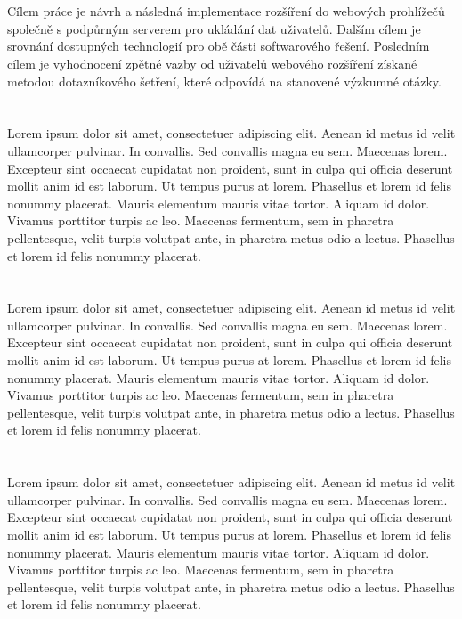 \section*{\CilPrace}
Cílem práce je návrh a následná implementace rozšíření do webových prohlížečů společně s podpůrným serverem pro ukládání dat uživatelů. Dalším cílem je srovnání dostupných technologií pro obě části softwarového řešení. Posledním cílem je vyhodnocení zpětné vazby od uživatelů webového rozšíření získané metodou dotazníkového šetření, které odpovídá na stanovené výzkumné otázky.

\section*{\PouziteMetody}
Lorem ipsum dolor sit amet, consectetuer adipiscing elit. Aenean id metus id velit ullamcorper pulvinar. In convallis. Sed convallis magna eu sem. Maecenas lorem. Excepteur sint occaecat cupidatat non proident, sunt in culpa qui officia deserunt mollit anim id est laborum. Ut tempus purus at lorem. Phasellus et lorem id felis nonummy placerat. Mauris elementum mauris vitae tortor. Aliquam id dolor. Vivamus porttitor turpis ac leo. Maecenas fermentum, sem in pharetra pellentesque, velit turpis volutpat ante, in pharetra metus odio a lectus. Phasellus et lorem id felis nonummy placerat.

\section*{\Vysledky}
Lorem ipsum dolor sit amet, consectetuer adipiscing elit. Aenean id metus id velit ullamcorper pulvinar. In convallis. Sed convallis magna eu sem. Maecenas lorem. Excepteur sint occaecat cupidatat non proident, sunt in culpa qui officia deserunt mollit anim id est laborum. Ut tempus purus at lorem. Phasellus et lorem id felis nonummy placerat. Mauris elementum mauris vitae tortor. Aliquam id dolor. Vivamus porttitor turpis ac leo. Maecenas fermentum, sem in pharetra pellentesque, velit turpis volutpat ante, in pharetra metus odio a lectus. Phasellus et lorem id felis nonummy placerat.

\section*{\PrinosAutora}
Lorem ipsum dolor sit amet, consectetuer adipiscing elit. Aenean id metus id velit ullamcorper pulvinar. In convallis. Sed convallis magna eu sem. Maecenas lorem. Excepteur sint occaecat cupidatat non proident, sunt in culpa qui officia deserunt mollit anim id est laborum. Ut tempus purus at lorem. Phasellus et lorem id felis nonummy placerat. Mauris elementum mauris vitae tortor. Aliquam id dolor. Vivamus porttitor turpis ac leo. Maecenas fermentum, sem in pharetra pellentesque, velit turpis volutpat ante, in pharetra metus odio a lectus. Phasellus et lorem id felis nonummy placerat.
